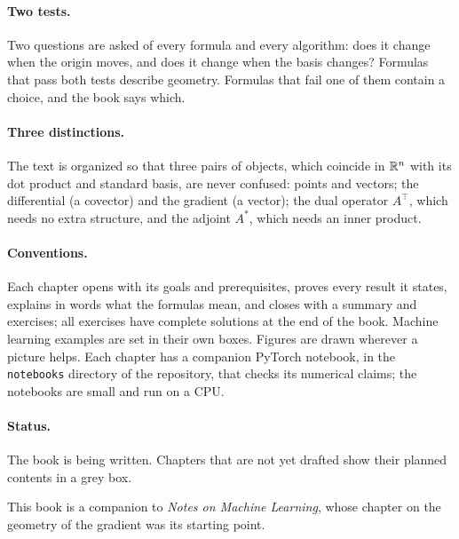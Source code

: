 \paragraph{Two tests.} Two questions are asked of every formula and every
algorithm: does it change when the origin moves, and does it change when
the basis changes? Formulas that pass both tests describe geometry.
Formulas that fail one of them contain a choice, and the book says which.

\paragraph{Three distinctions.} The text is organized so that three pairs
of objects, which coincide in $\mathbb{R}^n$ with its dot product and standard
basis, are never confused: points and vectors; the differential (a
covector) and the gradient (a vector); the dual operator $A^\top$, which
needs no extra structure, and the adjoint $A^*$, which needs an inner
product.

\paragraph{Conventions.} Each chapter opens with its goals and
prerequisites, proves every result it states, explains in words what the
formulas mean, and closes with a summary and exercises; all exercises have
complete solutions at the end of the book. Machine learning examples are
set in their own boxes. Figures are drawn wherever a picture helps. Each
chapter has a companion PyTorch notebook, in the \texttt{notebooks}
directory of the repository, that checks its numerical claims; the
notebooks are small and run on a CPU.

\paragraph{Status.} The book is being written. Chapters that are not yet
drafted show their planned contents in a grey box.

This book is a companion to \emph{Notes on Machine Learning}, whose chapter
on the geometry of the gradient was its starting point.
